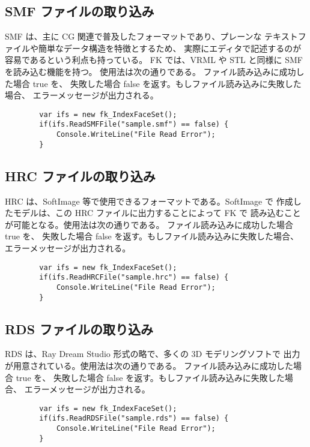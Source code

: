 \subsection{SMF ファイルの取り込み}
SMF は、主に CG 関連で普及したフォーマットであり、プレーンな
テキストファイルや簡単なデータ構造を特徴とするため、
実際にエディタで記述するのが容易であるという利点も持っている。
FK では、VRML や STL と同様に SMF を読み込む機能を持つ。
使用法は次の通りである。
ファイル読み込みに成功した場合 true を、
失敗した場合 false を返す。もしファイル読み込みに失敗した場合、
エラーメッセージが出力される。
\\
\begin{screen}
\begin{verbatim}
        var ifs = new fk_IndexFaceSet();
        if(ifs.ReadSMFFile("sample.smf") == false) {
            Console.WriteLine("File Read Error");
        }
\end{verbatim}
\end{screen}

\subsection{HRC ファイルの取り込み}
HRC は、SoftImage 等で使用できるフォーマットである。SoftImage で
作成したモデルは、この HRC ファイルに出力することによって FK で
読み込むことが可能となる。使用法は次の通りである。
ファイル読み込みに成功した場合 true を、
失敗した場合 false を返す。もしファイル読み込みに失敗した場合、
エラーメッセージが出力される。
\\
\begin{screen}
\begin{verbatim}
        var ifs = new fk_IndexFaceSet();
        if(ifs.ReadHRCFile("sample.hrc") == false) {
            Console.WriteLine("File Read Error");
        }
\end{verbatim}
\end{screen}

\subsection{RDS ファイルの取り込み}
RDS は、Ray Dream Studio 形式の略で、多くの 3D モデリングソフトで
出力が用意されている。使用法は次の通りである。
ファイル読み込みに成功した場合 true を、
失敗した場合 false を返す。もしファイル読み込みに失敗した場合、
エラーメッセージが出力される。
\\
\begin{screen}
\begin{verbatim}
        var ifs = new fk_IndexFaceSet();
        if(ifs.ReadRDSFile("sample.rds") == false) {
            Console.WriteLine("File Read Error");
        }
\end{verbatim}
\end{screen}

